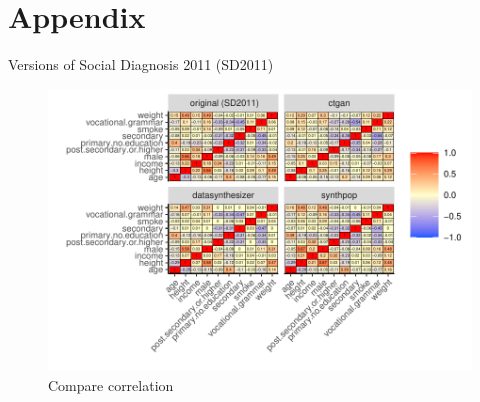 
\section{Appendix}\label{sec:appendix}
\setcounter{figure}{0}    
\setcounter{table}{0}    
\renewcommand*\thetable{\Alph{section}.\arabic{table}}
\renewcommand*\thefigure{\Alph{section}.\arabic{figure}}
\renewcommand{\theHfigure}{\Alph{section}.\arabic{table}}
\renewcommand{\theHtable}{\Alph{section}.\arabic{figure}}


\begin{table}[ht]
    \caption{Versions of Social Diagnosis 2011 (SD2011)}
    \centering
    
    \label{table:sd2011_versions}
\end{table}


\clearpage
\begin{figure}[ht]
  \caption{Compare correlation}
  \label{fig:compare_correlation}
  \centering
  \includegraphics[width=\linewidth]{../graphs/graph_correlation.pdf}
\end{figure}


